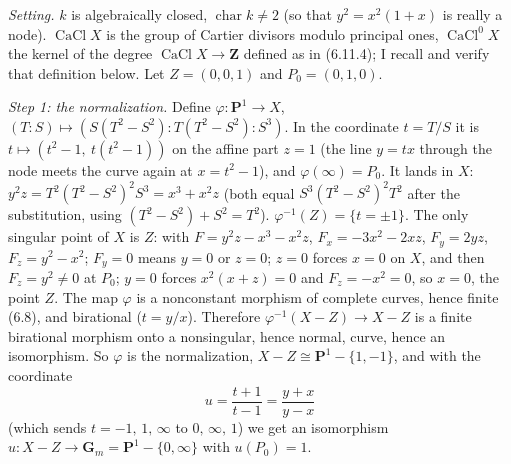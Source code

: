 \documentclass[11pt]{article}
\begin{document}
\pf
\emph{Setting.} $k$ is algebraically closed, $\operatorname{char}k\ne2$ (so that $y^2=x^2(1+x)$ is really a node). $\operatorname{CaCl}X$ is the group of Cartier divisors modulo principal ones, $\operatorname{CaCl}^0X$ the kernel of the degree $\operatorname{CaCl}X\to\mathbf Z$ defined as in (6.11.4); I recall and verify that definition below. Let $Z=(0,0,1)$ and $P_0=(0,1,0)$.

\emph{Step 1: the normalization.} Define $\varphi:\mathbf P^1\to X$, $(T:S)\mapsto(S(T^2-S^2):T(T^2-S^2):S^3)$. In the coordinate $t=T/S$ it is $t\mapsto(t^2-1,\ t(t^2-1))$ on the affine part $z=1$ (the line $y=tx$ through the node meets the curve again at $x=t^2-1$), and $\varphi(\infty)=P_0$. It lands in $X$: $y^2z=T^2(T^2-S^2)^2S^3=x^3+x^2z$ (both equal $S^3(T^2-S^2)^2T^2$ after the substitution, using $(T^2-S^2)+S^2=T^2$). $\varphi^{-1}(Z)=\{t=\pm1\}$. The only singular point of $X$ is $Z$: with $F=y^2z-x^3-x^2z$, $F_x=-3x^2-2xz$, $F_y=2yz$, $F_z=y^2-x^2$; $F_y=0$ means $y=0$ or $z=0$; $z=0$ forces $x=0$ on $X$, and then $F_z=y^2\ne0$ at $P_0$; $y=0$ forces $x^2(x+z)=0$ and $F_z=-x^2=0$, so $x=0$, the point $Z$. The map $\varphi$ is a nonconstant morphism of complete curves, hence finite (6.8), and birational ($t=y/x$). Therefore $\varphi^{-1}(X-Z)\to X-Z$ is a finite birational morphism onto a nonsingular, hence normal, curve, hence an isomorphism. So $\varphi$ is the normalization, $X-Z\cong\mathbf P^1-\{1,-1\}$, and with the coordinate
\[u=\frac{t+1}{t-1}=\frac{y+x}{y-x}\]
(which sends $t=-1,\,1,\,\infty$ to $0,\,\infty,\,1$) we get an isomorphism $u:X-Z\to\mathbf G_m=\mathbf P^1-\{0,\infty\}$ with $u(P_0)=1$.
\end{document}
